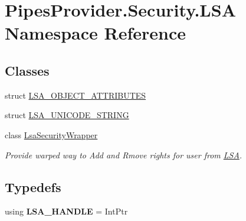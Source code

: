 \hypertarget{namespace_pipes_provider_1_1_security_1_1_l_s_a}{}\section{Pipes\+Provider.\+Security.\+L\+SA Namespace Reference}
\label{namespace_pipes_provider_1_1_security_1_1_l_s_a}
\subsection*{Classes}
\begin{DoxyCompactItemize}
\item 
struct \mbox{\hyperlink{struct_pipes_provider_1_1_security_1_1_l_s_a_1_1_l_s_a___o_b_j_e_c_t___a_t_t_r_i_b_u_t_e_s}{L\+S\+A\+\_\+\+O\+B\+J\+E\+C\+T\+\_\+\+A\+T\+T\+R\+I\+B\+U\+T\+ES}}
\item 
struct \mbox{\hyperlink{struct_pipes_provider_1_1_security_1_1_l_s_a_1_1_l_s_a___u_n_i_c_o_d_e___s_t_r_i_n_g}{L\+S\+A\+\_\+\+U\+N\+I\+C\+O\+D\+E\+\_\+\+S\+T\+R\+I\+NG}}
\item 
class \mbox{\hyperlink{class_pipes_provider_1_1_security_1_1_l_s_a_1_1_lsa_security_wrapper}{Lsa\+Security\+Wrapper}}
\begin{DoxyCompactList}\small\item\em Provide warped way to Add and Rmove rights for user from \mbox{\hyperlink{namespace_pipes_provider_1_1_security_1_1_l_s_a}{L\+SA}}. \end{DoxyCompactList}\end{DoxyCompactItemize}
\subsection*{Typedefs}
\begin{DoxyCompactItemize}
\item 
\mbox{\label{namespace_pipes_provider_1_1_security_1_1_l_s_a_aa8038141b4ccef48a4ada2ba706c8ef7}} 
using {\bfseries L\+S\+A\+\_\+\+H\+A\+N\+D\+LE} = Int\+Ptr
\end{DoxyCompactItemize}
